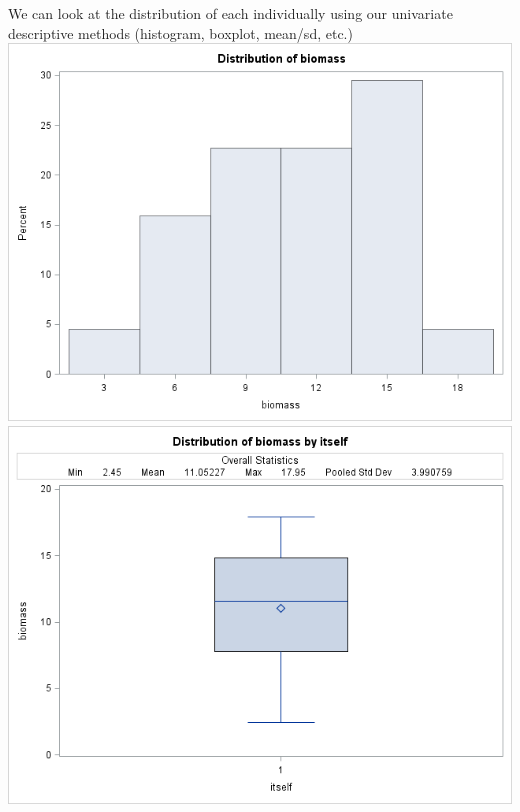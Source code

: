 We can look at the distribution of each individually using our univariate descriptive methods (histogram, boxplot, mean/sd, etc.)\\
\includegraphics[scale=0.35]{biomasshist}\includegraphics[scale=0.35]{biomassboxplot}\\

